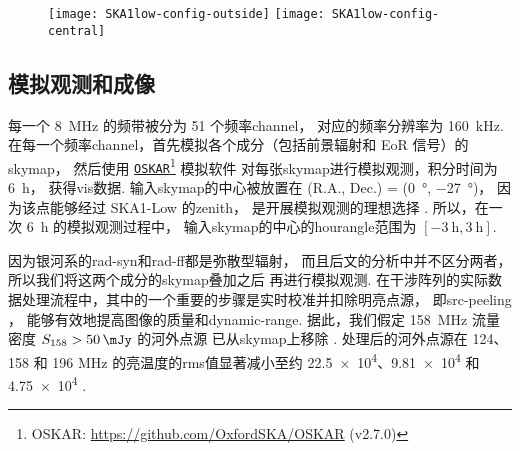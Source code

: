 \begin{figure}[htp]
  \centering
  \texttt{[image: SKA1low-config-outside]}%
  \hfill%
  \texttt{[image: SKA1low-config-central]}
  \label{fig:ska1low-config}
\end{figure}

\subsection{模拟观测和成像}

每一个 \SI{8}{\MHz} 的频带被分为 51 个频率\ac{channel}，
对应的频率分辨率为 \SI{160}{\kHz}.
在每一个频率\ac{channel}，首先模拟各个成分（包括前景辐射和 EoR 信号）的\ac{skymap}，
然后使用 \href{https://github.com/OxfordSKA/OSKAR}{\texttt{OSKAR}}\footnote{%
  OSKAR: \url{https://github.com/OxfordSKA/OSKAR} (v2.7.0)}
模拟软件\cite{mort2010}
对每张\ac{skymap}进行模拟观测，积分时间为 \SI{6}{\hour}，
获得\ac{vis}数据.
输入\ac{skymap}的中心被放置在
(R.A., Dec.\@) = (\SI{0}{\degree}, \SI{-27}{\degree})，
因为该点能够经过 SKA1-Low 的\ac{zenith}，
是开展模拟观测的理想选择 \cite{liu2009ps,datta2010}.
所以，在一次 \SI{6}{\hour} 的模拟观测过程中，
输入\ac{skymap}的中心的\ac{hourangle}范围为 $[-\SI{3}{\hour}, \SI{3}{\hour}]$.

因为银河系的\ac{rad-syn}和\ac{rad-ff}都是弥散型辐射，
而且后文的分析中并不区分两者，所以我们将这两个成分的\ac{skymap}叠加之后
再进行模拟观测.
在干涉阵列的实际数据处理流程中，其中的一个重要的步骤是实时校准并扣除明亮点源，
即\ac{src-peeling} \cite{noordam2004,mitchell2008,intema2009}，
能够有效地提高图像的质量和\ac{dynamic-range}.
据此，我们假定 \SI{158}{\MHz} 流量密度 $S_{158} > \SI{50}{\mJy}$ 的河外点源
已从\ac{skymap}上移除 \cite{liu2009ps,pindor2011,mort2017}.
处理后的河外点源在 124、158 和 196 \si{MHz} 的亮温度的\ac{rms}值显著减小至约
\num{22.5e4}、\num{9.81e4} 和 \num{4.75e4} \si{\mK}.

